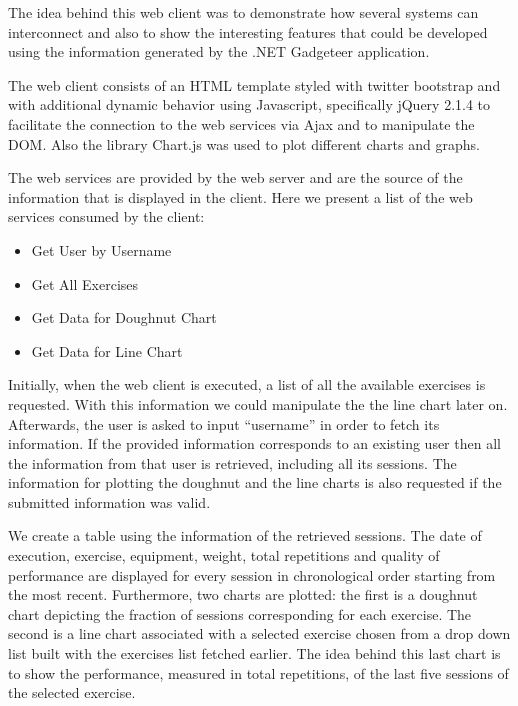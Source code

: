 \documentclass{tk3-team}
\begin{document}
The idea behind this web client was to demonstrate how several systems can interconnect and also to show the interesting features that could be developed using the information generated by the .NET Gadgeteer application. 

The web client consists of an HTML template styled with twitter bootstrap and with additional dynamic behavior using Javascript, specifically jQuery 2.1.4 to facilitate the connection to the web services via Ajax and to manipulate the DOM. Also the library Chart.js was used to plot different charts and graphs. 

The web services are provided by the web server and are the source of the information that is displayed in the client. Here we present a list of the web services consumed by the client:

\begin{itemize}
	\item Get User by Username
	\item Get All Exercises
	\item Get Data for Doughnut Chart
	\item Get Data for Line Chart
\end{itemize}

Initially, when the web client is executed, a list of all the available exercises is requested. With this information we could manipulate the the line chart later on. Afterwards, the user is asked to input ``username'' in order to fetch its information. If the provided information corresponds to an existing user then all the information from that user is retrieved, including all its sessions. The information for plotting the doughnut and the line charts is also requested if the submitted information was valid.

We create a table using the information of the retrieved sessions. The date of execution, exercise, equipment, weight, total repetitions and quality of performance are displayed for every session in chronological order starting from the most recent. Furthermore, two charts are plotted: the first is a doughnut chart depicting the fraction of sessions corresponding for each exercise. The second is a line chart associated with a selected exercise chosen from a drop down list built with the exercises list fetched earlier. The idea behind this last chart is to show the performance, measured in total repetitions, of the last five sessions of the selected exercise.
\end{document}
